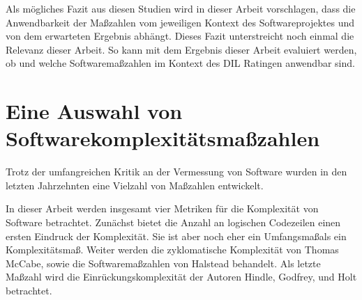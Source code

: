 Als mögliches Fazit aus diesen Studien wird in dieser Arbeit
vorschlagen, dass die Anwendbarkeit der Ma\ss zahlen vom jeweiligen Kontext
des Softwareprojektes und von dem erwarteten Ergebnis abhängt. Dieses
Fazit unterstreicht noch einmal die Relevanz dieser Arbeit. So kann mit
dem Ergebnis dieser Arbeit evaluiert werden, ob und welche
Softwarema\ss zahlen im Kontext des \ac{DIL} Ratingen anwendbar sind.

\section{Eine Auswahl von Softwarekomplexitätsma\ss zahlen}\label{eine-auswahl-von-softwarekomplexitatsmasszahlen}

Trotz der umfangreichen Kritik an der Vermessung von Software wurden in
den letzten Jahrzehnten eine Vielzahl von Ma\ss zahlen entwickelt.

In dieser Arbeit werden insgesamt vier Metriken für die Komplexität von
Software betrachtet. Zunächst bietet die Anzahl an logischen Codezeilen
einen ersten Eindruck der Komplexität. Sie ist aber noch eher ein
Umfangsma\ss  als ein Komplexitätsma\ss . Weiter werden die zyklomatische
Komplexität von Thomas McCabe, sowie die Softwarema\ss zahlen von Halstead
behandelt. Als letzte Ma\ss zahl wird die Einrückungskomplexität der
Autoren Hindle, Godfrey, und Holt betrachtet.

